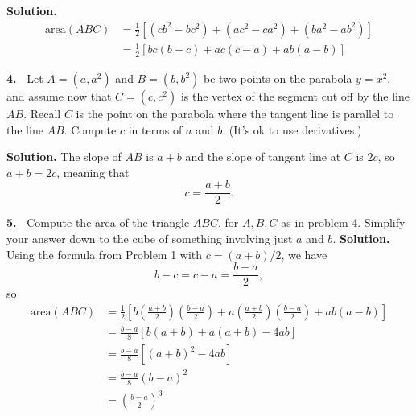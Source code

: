 \documentclass[12pt]{article}
\theoremstyle{definition}
\theoremstyle{remark}
\theoremstyle{definition}
\newenvironment{Solution}{\noindent\textbf{Solution.}}{}
\begin{document}
\begin{Solution} 
\[\begin{split}
\text{area}(ABC)
&=\tfrac{1}{2}\left[(cb^2-bc^2)+(ac^2-ca^2)+(ba^2-ab^2)\right]\\
&=\tfrac{1}{2}\left[bc(b-c)+ac(c-a)+ab(a-b)\right]
\end{split}
\]
\end{Solution} 

\vskip20pt
{\bf 4.\ }
Let $A=(a,a^2)$ and $B=(b,b^2)$ be two points on the parabola $y=x^2$, and assume now that  $C=(c,c^2)$ is the vertex of the segment cut off by the line $AB$. Recall $C$ is the point on the parabola where the tangent line is parallel to the line $AB$.
Compute $c$ in terms of $a$ and $b$. (It's ok to use derivatives.)

\begin{Solution} The slope of $AB$ is $a+b$ and the slope of tangent line at $C$ is $2c$, so $a+b=2c$, meaning that 
\[c=\frac{a+b}{2}.\]
\end{Solution} 



\vskip20pt


{\bf 5.\ }
Compute the area of the triangle $ABC$, for $A,B,C$ as in problem 4. Simplify your answer down to the cube of something involving just $a$ and $b$. 
\vskip5pt
\begin{Solution} Using the formula from Problem 1 with $c=(a+b)/2$, we have 
\[b-c=c-a=\frac{b-a}{2},\]
so 
\[\begin{split}
\text{area}(ABC)
&=\frac{1}{2}\left[
b\left(\frac{a+b}{2}\right)\left(\frac{b-a}{2}\right)
+a\left(\frac{a+b}{2}\right)\left(\frac{b-a}{2}\right)+ab(a-b)
\right]\\
&=\frac{b-a}{8}\left[b(a+b)+a(a+b)-4ab\right]\\
&=\frac{b-a}{8}\left[(a+b)^2-4ab\right]\\
&=\frac{b-a}{8}(b-a)^2\\
&=\left(\frac{b-a}{2}\right)^3
\end{split}
\]

\end{Solution}
\end{document}
